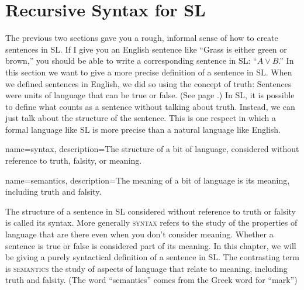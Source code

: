 \section{Recursive Syntax for SL}\label{recursive_syntax_for_SL}

The previous two sections gave you a rough, informal sense of how to create sentences in SL. If I give you an English sentence like ``Grass is either green or brown,'' you should be able to write a corresponding sentence in SL: ``$A \lor B$.'' In this section we want to give a more precise definition of a sentence in SL.  When we defined sentences in English, we did so using the concept of truth: Sentences were units of language that can be true or false. (See page \pageref{def:statement}.) In SL, it is possible to define what counts as a sentence without talking about truth. Instead, we can just talk about the structure of the sentence. This is one respect in which a formal language like SL is more precise than a natural language like English.

{
name=syntax,
description={The structure of a bit of language, considered without reference to truth, falsity, or meaning.}
}

{
name=semantics,
description={The meaning of a bit of language is its meaning, including truth and falsity.}
}

The structure of a sentence in SL considered without reference to truth or falsity is called its syntax. More generally \textsc{\gls{syntax}} \label{def:syntax} refers to the study of the properties of language that are there even when you don't consider meaning. Whether a sentence is true or false is considered part of its meaning. In this chapter, we will be giving a purely syntactical definition of a sentence in SL.  The contrasting term is \textsc{\gls{semantics}} \label{def:semantics} the study of aspects of language that relate to meaning, including truth and falsity. (The word ``semantics'' comes from the Greek word for ``mark'')

